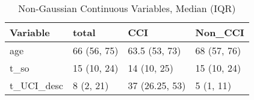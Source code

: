 \begin{table}

\caption{Non-Gaussian Continuous Variables, Median (IQR)}
\centering
\begin{tabular}[t]{l|l|l|l}
\hline
Variable & total & CCI & Non\_CCI\\
\hline
age & 66 (56, 75) & 63.5 (53, 73) & 68 (57, 76)\\
\hline
t\_so & 15 (10, 24) & 14 (10, 25) & 15 (10, 24)\\
\hline
t\_UCI\_desc & 8 (2, 21) & 37 (26.25, 53) & 5 (1, 11)\\
\hline
\end{tabular}
\end{table}
